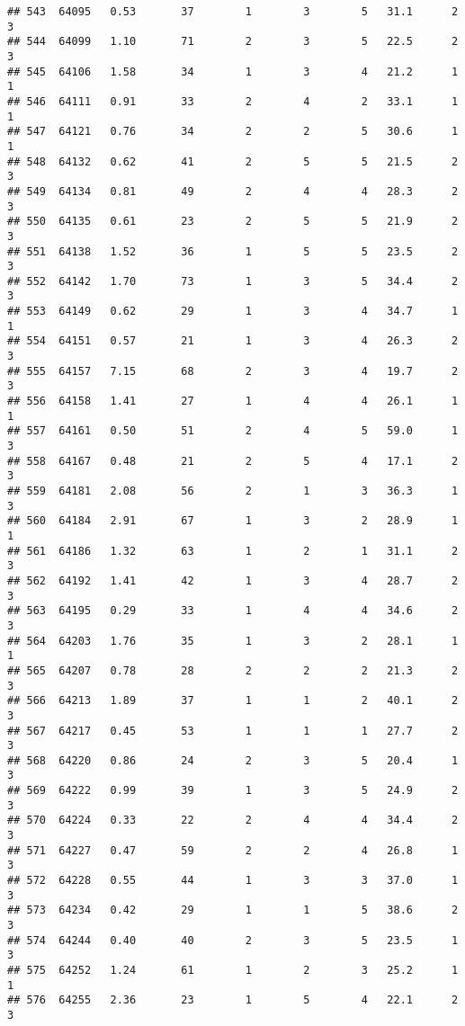 \documentclass[
]{article}
\begin{document}
\begin{verbatim}
## 543  64095   0.53       37        1        3        5   31.1      2      3
## 544  64099   1.10       71        2        3        5   22.5      2      3
## 545  64106   1.58       34        1        3        4   21.2      1      1
## 546  64111   0.91       33        2        4        2   33.1      1      1
## 547  64121   0.76       34        2        2        5   30.6      1      1
## 548  64132   0.62       41        2        5        5   21.5      2      3
## 549  64134   0.81       49        2        4        4   28.3      2      3
## 550  64135   0.61       23        2        5        5   21.9      2      3
## 551  64138   1.52       36        1        5        5   23.5      2      3
## 552  64142   1.70       73        1        3        5   34.4      2      3
## 553  64149   0.62       29        1        3        4   34.7      1      1
## 554  64151   0.57       21        1        3        4   26.3      2      3
## 555  64157   7.15       68        2        3        4   19.7      2      3
## 556  64158   1.41       27        1        4        4   26.1      1      1
## 557  64161   0.50       51        2        4        5   59.0      1      3
## 558  64167   0.48       21        2        5        4   17.1      2      3
## 559  64181   2.08       56        2        1        3   36.3      1      3
## 560  64184   2.91       67        1        3        2   28.9      1      1
## 561  64186   1.32       63        1        2        1   31.1      2      3
## 562  64192   1.41       42        1        3        4   28.7      2      3
## 563  64195   0.29       33        1        4        4   34.6      2      3
## 564  64203   1.76       35        1        3        2   28.1      1      1
## 565  64207   0.78       28        2        2        2   21.3      2      3
## 566  64213   1.89       37        1        1        2   40.1      2      3
## 567  64217   0.45       53        1        1        1   27.7      2      3
## 568  64220   0.86       24        2        3        5   20.4      1      3
## 569  64222   0.99       39        1        3        5   24.9      2      3
## 570  64224   0.33       22        2        4        4   34.4      2      3
## 571  64227   0.47       59        2        2        4   26.8      1      3
## 572  64228   0.55       44        1        3        3   37.0      1      3
## 573  64234   0.42       29        1        1        5   38.6      2      3
## 574  64244   0.40       40        2        3        5   23.5      1      3
## 575  64252   1.24       61        1        2        3   25.2      1      1
## 576  64255   2.36       23        1        5        4   22.1      2      3

\end{verbatim}
\end{document}
